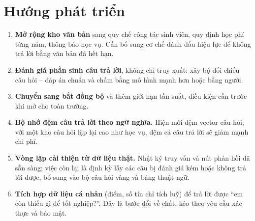 \section{Hướng phát triển}

\begin{enumerate}
  \item \textbf{Mở rộng kho văn bản} sang quy chế công tác sinh viên, quy định học phí từng
  năm, thông báo học vụ. Cần bổ sung cơ chế đánh dấu hiệu lực để không trả lời bằng văn bản đã
  hết hạn.
  \item \textbf{Đánh giá phần sinh câu trả lời}, không chỉ truy xuất: xây bộ đối chiếu câu hỏi
  – đáp án chuẩn và chấm bằng mô hình mạnh hơn hoặc bằng người.
  \item \textbf{Chuyển  sang bất đồng bộ} và thêm giới hạn tần suất, điều kiện cần
  trước khi mở cho toàn trường.
  \item \textbf{Bộ nhớ đệm câu trả lời theo ngữ nghĩa.} Hiện mới đệm vector câu hỏi; với một
  kho câu hỏi lặp lại cao như học vụ, đệm cả câu trả lời sẽ giảm mạnh chi phí.
  \item \textbf{Vòng lặp cải thiện từ dữ liệu thật.} Nhật ký truy vấn và nút phản hồi đã sẵn
  sàng; việc còn lại là định kỳ lấy các câu bị đánh giá kém hoặc không trả lời được, bổ sung
  vào bộ câu hỏi vàng và bảng thuật ngữ.
  \item \textbf{Tích hợp dữ liệu cá nhân} (điểm, số tín chỉ tích luỹ) để trả lời được “em còn
  thiếu gì để tốt nghiệp?”. Đây là bước đổi về chất, kéo theo yêu cầu xác thực và bảo mật.
\end{enumerate}

\chapterbreak
